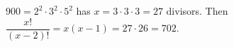 $900=2^2\cdot3^2\cdot5^2$ has $x=3\cdot3\cdot3=27$ divisors. Then $\dfrac{x!}{(x-2)!}=x(x-1)=27\cdot26=\boxed{702}$.

